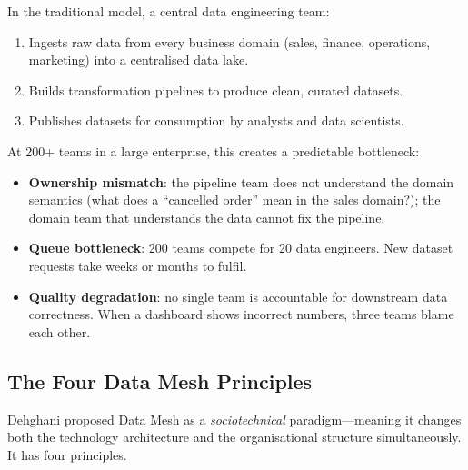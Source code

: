 In the traditional model, a central data engineering team:
\begin{enumerate}
  \item Ingests raw data from every business domain (sales, finance,
        operations, marketing) into a centralised data lake.
  \item Builds transformation pipelines to produce clean, curated datasets.
  \item Publishes datasets for consumption by analysts and data scientists.
\end{enumerate}

At 200+ teams in a large enterprise, this creates a predictable bottleneck:
\begin{itemize}
  \item \textbf{Ownership mismatch}: the pipeline team does not understand
        the domain semantics (what does a ``cancelled order'' mean in the
        sales domain?); the domain team that understands the data cannot
        fix the pipeline.
  \item \textbf{Queue bottleneck}: 200 teams compete for 20 data engineers.
        New dataset requests take weeks or months to fulfil.
  \item \textbf{Quality degradation}: no single team is accountable for
        downstream data correctness. When a dashboard shows incorrect
        numbers, three teams blame each other.
\end{itemize}

\subsection{The Four Data Mesh Principles}
\label{subsec:mesh-principles}

Dehghani proposed Data Mesh as a \emph{sociotechnical} paradigm---meaning
it changes both the technology architecture and the organisational structure
simultaneously. It has four principles.

